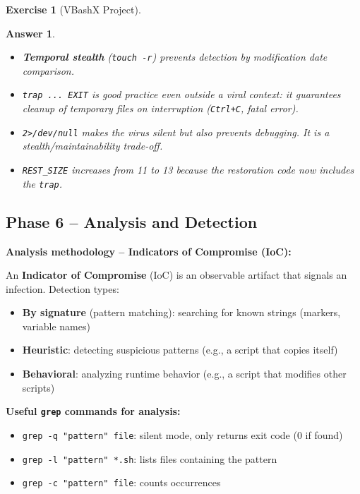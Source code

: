 \documentclass[a4paper,11pt]{article}
\theoremstyle{plain}
\newtheorem{correction}{Answer}
\theoremstyle{definition}
\newtheorem{exercice}{Exercise}
\begin{document}
\begin{exercice}[VBashX Project]
\begin{correction}
\begin{pointcle}
\begin{itemize}
    \item \textbf{Temporal stealth} (\texttt{touch -r}) prevents detection by modification date comparison.
    \item \texttt{trap ... EXIT} is good practice even outside a viral context: it guarantees cleanup of temporary files on interruption (\texttt{Ctrl+C}, fatal error).
    \item \texttt{2>/dev/null} makes the virus silent but also prevents debugging. It is a stealth/maintainability trade-off.
    \item \texttt{REST\_SIZE} increases from 11 to 13 because the restoration code now includes the \texttt{trap}.
\end{itemize}
\end{pointcle}

\end{correction}



\subsection*{Phase 6 -- Analysis and Detection}

\begin{rappel}
\textbf{Analysis methodology -- Indicators of Compromise (IoC):}

An \textbf{Indicator of Compromise} (IoC) is an observable artifact that signals an infection. Detection types:
\begin{itemize}
    \item \textbf{By signature} (pattern matching): searching for known strings (markers, variable names)
    \item \textbf{Heuristic}: detecting suspicious patterns (e.g., a script that copies itself)
    \item \textbf{Behavioral}: analyzing runtime behavior (e.g., a script that modifies other scripts)
\end{itemize}

\textbf{Useful \texttt{grep} commands for analysis:}
\begin{itemize}
    \item \texttt{grep -q "pattern" file}: silent mode, only returns exit code (0 if found)
    \item \texttt{grep -l "pattern" *.sh}: lists files containing the pattern
    \item \texttt{grep -c "pattern" file}: counts occurrences
\end{itemize}
\end{rappel}


\end{exercice}
\end{document}
